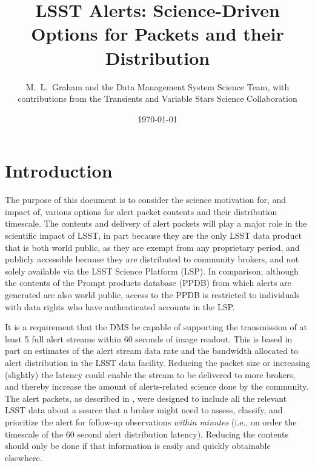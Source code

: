 \documentclass[DM,lsstdraft,authoryear,toc]{lsstdoc}
\title[Alerts Menu]{LSST Alerts: Science-Driven Options for Packets and their Distribution}
\author{%
M.~L.~Graham and the Data Management System Science Team, with contributions from the Transients and Variable Stars Science Collaboration
}
\date{\today}
\begin{document}

\maketitle

\section{Introduction} \label{sec:intro}


The purpose of this document is to consider the science motivation for, and impact of, various options for alert packet contents and their distribution timescale.
The contents and delivery of alert packets will play a major role in the scientific impact of LSST, in part because they are the only LSST data product that is both world public, as they are exempt from any proprietary period, and publicly accessible because they are distributed to community brokers, and not solely available via the LSST Science Platform (LSP).
In comparison, although the contents of the Prompt products database (PPDB) from which alerts are generated are also world public, access to the PPDB is restricted to individuals with data rights  who have authenticated accounts in the LSP.

It is a requirement that the DMS be capable of supporting the transmission of at least 5 full alert streams within 60 seconds of image readout.
This is based in part on estimates of the alert stream data rate and the bandwidth allocated to alert distribution in the LSST data facility.
Reducing the packet size or increasing (slightly) the latency could enable the stream to be delivered to more brokers, and thereby increase the amount of alerts-related science done by the community.
The alert packets, as described in , were designed to include all the relevant LSST data about a source that a broker might need to assess, classify, and prioritize the alert for follow-up observations \emph{within minutes} (i.e., on order the timescale of the 60 second alert distribution latency).
Reducing the contents should only be done if that information is easily and quickly obtainable elsewhere. 
\end{document}
